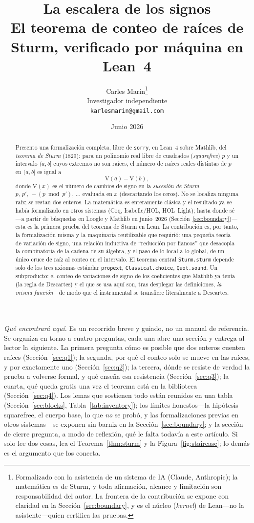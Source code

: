 \documentclass[11pt]{article}
\title{\bf La escalera de los signos\\[4pt]
  \large\normalfont El teorema de conteo de ra\'ices de Sturm, verificado por m\'aquina en Lean~4}
\author{Carles Mar\'in\thanks{Formalizado con la asistencia de un sistema de IA (Claude,
Anthropic); la matem\'atica es de Sturm, y toda afirmaci\'on, alcance y limitaci\'on son
responsabilidad del autor. La frontera de la contribuci\'on se expone con claridad en la
Secci\'on~\ref{sec:boundary}, y es el n\'ucleo (\emph{kernel}) de Lean---no la asistente---quien
certifica las pruebas.}\\[3pt]
  \normalsize Investigador independiente\\
  \normalsize \texttt{karlesmarin@gmail.com}}
\date{Junio 2026}
\newcommand{\lean}[1]{\texttt{#1}}
\newcommand{\V}{\mathrm{V}}
\begin{document}
\maketitle

\begin{abstract}
Presento una formalizaci\'on completa, libre de \lean{sorry}, en Lean~4 sobre Mathlib, del
\emph{teorema de Sturm} (1829): para un polinomio real libre de cuadrados (\emph{squarefree})
$p$ y un intervalo $(a,b]$ cuyos extremos no son ra\'ices, el n\'umero de ra\'ices reales
distintas de $p$ en $(a,b]$ es igual a
\[
  \V(a)-\V(b),
\]
donde $\V(x)$ es el n\'umero de cambios de signo en la \emph{sucesi\'on de Sturm}
$p,\,p',\,-(p \bmod p'),\,\dots$ evaluada en $x$ (descartando los ceros). No se localiza ninguna
ra\'iz; se restan dos enteros. La matem\'atica es enteramente cl\'asica y el resultado ya se hab\'ia
formalizado en otros sistemas (Coq, Isabelle/HOL, HOL~Light); hasta donde s\'e---a partir de
b\'usquedas en Loogle y Mathlib en junio~2026 (Secci\'on~\ref{sec:boundary})---esta es la primera
prueba del teorema de Sturm en Lean. La contribuci\'on es, por tanto, la formalizaci\'on misma y la
maquinaria reutilizable que requiri\'o: una peque\~na teor\'ia de variaci\'on de signo, una
relaci\'on inductiva de ``reducci\'on por flancos'' que desacopla la combinatoria de la cadena de su
\'algebra, y el paso de lo local a lo global, de un \'unico cruce de ra\'iz al conteo en el
intervalo. El teorema central \lean{Sturm.sturm} depende solo de los tres axiomas est\'andar
\lean{propext}, \lean{Classical.choice}, \lean{Quot.sound}. Un subproducto: el conteo de variaciones
de signo de los coeficientes que Mathlib ya ten\'ia (la regla de Descartes) y el que se usa aqu\'i
son, tras desplegar las definiciones, \emph{la misma funci\'on}---de modo que el instrumental se
transfiere literalmente a Descartes.
\end{abstract}

\medskip
\noindent\emph{Qu\'e encontrar\'a aqu\'i.} Es un recorrido breve y guiado, no un manual de
referencia. Se organiza en torno a cuatro preguntas, cada una abre una secci\'on y entrega al lector
la siguiente. La primera pregunta c\'omo es posible que dos enteros cuenten ra\'ices
(Secci\'on~\ref{sec:q1}); la segunda, por qu\'e el conteo solo se mueve en las ra\'ices, y por
exactamente uno (Secci\'on~\ref{sec:q2}); la tercera, d\'onde se resiste de verdad la prueba a
volverse formal, y qu\'e ense\~na esa resistencia (Secci\'on~\ref{sec:q3}); la cuarta, qu\'e queda
gratis una vez el teorema est\'a en la biblioteca (Secci\'on~\ref{sec:q4}). Los lemas que sostienen
todo est\'an reunidos en una tabla (Secci\'on~\ref{sec:blocks}, Tabla~\ref{tab:inventory}); los
l\'imites honestos---la hip\'otesis squarefree, el cuerpo base, lo que \emph{no} se prob\'o, y las
formalizaciones previas en otros sistemas---se exponen sin barniz en la Secci\'on~\ref{sec:boundary};
y la secci\'on de cierre pregunta, a modo de reflexi\'on, qu\'e le falta todav\'ia a este art\'iculo.
Si solo lee dos cosas, lea el Teorema~\ref{thm:sturm} y la Figura~\ref{fig:staircase}; lo dem\'as es
el argumento que los conecta.
\end{document}
